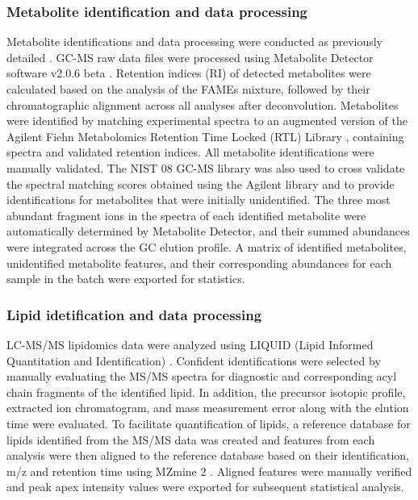 \subsubsection{Metabolite identification and data processing}
Metabolite identifications and data processing were conducted as previously detailed \cite{webb-robertsonbj_metzto:StatisticalAnalysis2014}. GC-MS raw data files were processed using Metabolite Detector software v2.0.6 beta \cite{hillerk_schomburgd:MetaboliteDetectorComprehensive2009}. Retention indices (RI) of detected metabolites were calculated based on the analysis of the FAMEs mixture, followed by their chromatographic alignment across all analyses after deconvolution. Metabolites were identified by matching experimental spectra to an augmented version of the Agilent Fiehn Metabolomics Retention Time Locked (RTL) Library \cite{kindt_fiehno:FiehnLibMass2009}, containing spectra and validated retention indices. All metabolite identifications were manually validated. The NIST 08 GC-MS library was also used to cross validate the spectral matching scores obtained using the Agilent library and to provide identifications for metabolites that were initially unidentified. The three most abundant fragment ions in the spectra of each identified metabolite were automatically determined by Metabolite Detector, and their summed abundances were integrated across the GC elution profile. A matrix of identified metabolites, unidentified metabolite features, and their corresponding abundances for each sample in the batch were exported for statistics.

\subsubsection{Lipid idetification and data processing}
LC-MS/MS lipidomics data were analyzed using LIQUID (Lipid Informed Quantitation and Identification) \cite{kyleje_metzto:LIQUIDAnopen2017}. Confident identifications were selected by manually evaluating the MS/MS spectra for diagnostic and corresponding acyl chain fragments of the identified lipid. In addition, the precursor isotopic profile, extracted ion chromatogram, and mass measurement error along with the elution time were evaluated. To facilitate quantification of lipids, a reference database for lipids identified from the MS/MS data was created and features from each analysis were then aligned to the reference database based on their identification, m/z and retention time using MZmine 2 \cite{pluskalt_oresicm:MZmineModular2010}. Aligned features were manually verified and peak apex intensity values were exported for subsequent statistical analysis.


